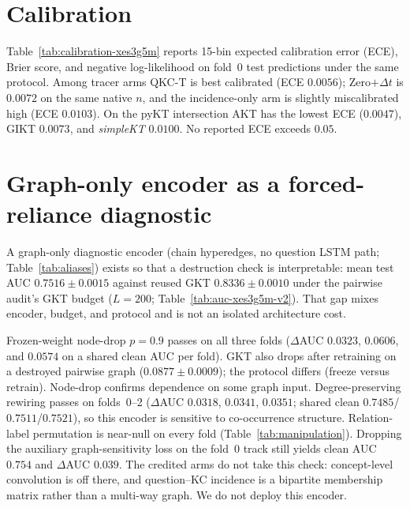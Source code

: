 \documentclass[review,12pt]{elsarticle}
\begin{document}



\FloatBarrier
\section{Calibration}
\label{app:calibration}
\label{sec:calibration}
Table~\ref{tab:calibration-xes3g5m} reports 15-bin expected calibration
error (ECE), Brier score, and negative log-likelihood on fold~0 test
predictions under the same protocol. Among tracer arms QKC-T is best
calibrated (ECE $0.0056$); Zero$+\Delta t$ is $0.0072$ on the same
native $n$, and the incidence-only arm is slightly miscalibrated high
(ECE $0.0103$). On the pyKT intersection AKT has the lowest ECE
($0.0047$), GIKT $0.0073$, and \textit{simpleKT} $0.0100$. No reported
ECE exceeds $0.05$.




\FloatBarrier
\section{Graph-only encoder as a forced-reliance diagnostic}
\label{app:graph-only}
\label{sec:manipulation-result}
A graph-only diagnostic encoder (chain hyperedges, no question LSTM
path; Table~\ref{tab:aliases}) exists so that a destruction check is
interpretable: mean test AUC $0.7516{\pm}0.0015$ against reused GKT
$0.8336{\pm}0.0010$ under the pairwise audit's GKT budget ($L{=}200$;
Table~\ref{tab:auc-xes3g5m-v2}). That gap mixes encoder, budget, and
protocol and is not an isolated architecture cost.



Frozen-weight node-drop $p{=}0.9$ passes on all three folds
($\Delta$AUC $0.0323$, $0.0606$, and $0.0574$ on a shared clean AUC
per fold). GKT also drops after retraining on a destroyed pairwise graph
($0.0877{\pm}0.0009$); the protocol differs (freeze versus retrain).
Node-drop confirms dependence on some graph input. Degree-preserving
rewiring passes on folds~0--2 ($\Delta$AUC $0.0318$, $0.0341$, $0.0351$;
shared clean $0.7485$/$0.7511$/$0.7521$), so this encoder is sensitive
to co-occurrence structure. Relation-label permutation is near-null on
every fold (Table~\ref{tab:manipulation}). Dropping the auxiliary
graph-sensitivity loss on the fold~0 track still yields clean AUC
$0.754$ and $\Delta$AUC $0.039$. The credited arms do not take this
check: concept-level convolution is off there, and question--KC
incidence is a bipartite membership matrix rather than a multi-way
graph. We do not deploy this encoder.
\end{document}
